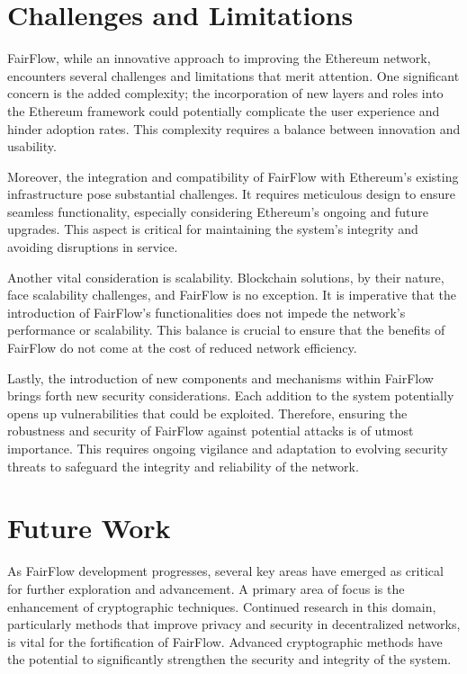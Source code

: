 \documentclass{article}
\begin{document}
\section{Challenges and Limitations}

FairFlow, while an innovative approach to improving the Ethereum network, encounters several challenges and limitations that merit attention. One significant concern is the added complexity; the incorporation of new layers and roles into the Ethereum framework could potentially complicate the user experience and hinder adoption rates. This complexity requires a balance between innovation and usability.

Moreover, the integration and compatibility of FairFlow with Ethereum's existing infrastructure pose substantial challenges. It requires meticulous design to ensure seamless functionality, especially considering Ethereum's ongoing and future upgrades. This aspect is critical for maintaining the system's integrity and avoiding disruptions in service.

Another vital consideration is scalability. Blockchain solutions, by their nature, face scalability challenges, and FairFlow is no exception. It is imperative that the introduction of FairFlow's functionalities does not impede the network's performance or scalability. This balance is crucial to ensure that the benefits of FairFlow do not come at the cost of reduced network efficiency.

Lastly, the introduction of new components and mechanisms within FairFlow brings forth new security considerations. Each addition to the system potentially opens up vulnerabilities that could be exploited. Therefore, ensuring the robustness and security of FairFlow against potential attacks is of utmost importance. This requires ongoing vigilance and adaptation to evolving security threats to safeguard the integrity and reliability of the network.

\section{Future Work}

As FairFlow development progresses, several key areas have emerged as critical for further exploration and advancement. A primary area of focus is the enhancement of cryptographic techniques. Continued research in this domain, particularly methods that improve privacy and security in decentralized networks, is vital for the fortification of FairFlow. Advanced cryptographic methods have the potential to significantly strengthen the security and integrity of the system.
\end{document}
